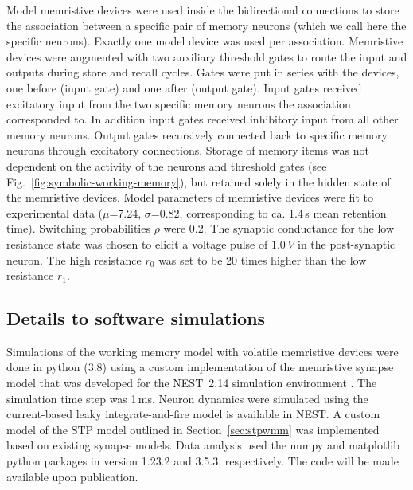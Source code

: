 Model memristive devices were used inside the bidirectional connections to store the association between a specific pair of memory neurons (which we call here the specific neurons). Exactly one model device was used per association. Memristive devices were augmented with two auxiliary threshold gates to route the input and outputs during store and recall cycles. Gates were put in series with the devices, one before (input gate) and one after (output gate). Input gates received excitatory input from the two specific memory neurons the association corresponded to. In addition input gates received inhibitory input from all other memory neurons. Output gates recursively connected back to specific memory neurons through excitatory connections. Storage of memory items was not dependent on the activity of the neurons and threshold gates (see Fig.~\ref{fig:symbolic-working-memory}), but retained solely in the hidden state of the memristive devices. Model parameters of memristive devices were fit to experimental data ($\mu$=7.24, $\sigma$=0.82, corresponding to ca. 1.4\,s mean retention time). Switching probabilities $\rho$ were 0.2. The synaptic conductance for the low resistance state was chosen to elicit a voltage pulse of $1.0\,V$ in the post-synaptic neuron. The high resistance $r_0$ was set to be 20 times higher than the low resistance $r_1$.

\subsection{Details to software simulations}

Simulations of the working memory model with volatile memristive devices were done in python (3.8) using a custom implementation of the memristive synapse model that was developed for the NEST~2.14 simulation environment \cite{Peyser:838729}. The simulation time step was 1\,ms. Neuron dynamics were simulated using the current-based leaky integrate-and-fire model is available in NEST. A custom model of the STP model outlined in Section~\ref{sec:stpwmm} was implemented based on existing synapse models. Data analysis used the numpy and matplotlib python packages in version 1.23.2 and 3.5.3, respectively. The code will be made available upon publication.
